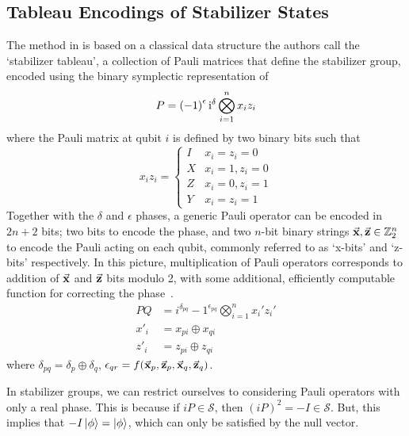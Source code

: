 \subsection{Tableau Encodings of Stabilizer States}\label{sec:sympencoding}
The method in \cite{Aaronson2004} is based on a classical data structure the authors call the `stabilizer tableau', a collection of Pauli matrices that define the stabilizer group, encoded using the binary symplectic representation of \cite{Dehaene2003}
\begin{equation} P = \left(-1\right)^{\epsilon} \mathrm{i}^{\delta}\bigotimes_{i=1}^{n} x_{i}z_{i}\end{equation}
where the Pauli matrix at qubit $i$ is defined by two binary bits such that
\begin{equation}
    x_{i}z_{i} = \begin{cases}
    I & x_{i}=z_{i}=0\\
    X & x_{i}=1, z_{i}=0 \\ 
    Z  &x_{i}=0, z_{i}=1 \\
    Y  &x_{i}=z_{i}=1
    \end{cases}
\end{equation}
Together with the $\delta$ and $\epsilon$ phases, a generic Pauli operator can be encoded in $2n+2$ bits; two bits to encode the phase, and two $n$-bit binary strings $\va{x},\va{z}\in\mathbb{Z}_{2}^{n}$ to encode the Pauli acting on each qubit, commonly referred to as `x-bits' and `z-bits' respectively. In this picture, multiplication of Pauli operators corresponds to addition of $\va{x}$ and $\va{z}$ bits modulo 2, with some additional, efficiently computable function for correcting the phase~\cite{Dehaene2003}.
\begin{align}
    P Q &= i^{\delta_{pq}}-1^{\epsilon_{pq}}\bigotimes_{i=1}^{n}x_{i}' z_{i}' \\
    x'_{i} &= x_{pi}\oplus x_{qi} \\
    z'_{i} &= z_{pi} \oplus z_{qi}
\end{align}
where $\delta_{pq} = \delta_{p}\oplus \delta_{q}$, $\epsilon_{qr} = f(\va{x}_{p}, \va{z}_{p}, \va{x}_{q}, \va{z}_{q})$.\par
In stabilizer groups, we can restrict ourselves to considering Pauli operators with only a real phase. This is because if $iP\in\mathcal{S}$, then $(iP)^{2}=-I\in\mathcal{S}$. But, this implies that $-I\ket{\phi}=\ket{\phi}$, which can only be satisfied by the null vector.\par
